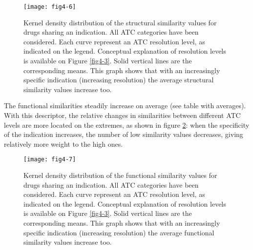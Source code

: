 \begin{figure}[H]
    \centering
    \texttt{[image: fig4-6]}
    \caption{Kernel density distribution of the structural similarity values for drugs sharing an indication. All ATC categories have been considered. Each curve represent an ATC resolution level, as indicated on the legend. Conceptual explanation of resolution levels is available on Figure \ref{fig4-3}. Solid vertical lines are the corresponding means. This graph shows that with an increasingly specific indication (increasing resolution) the average structural similarity values increase too.}
    \label{fig4-6}
\end{figure}

The functional similarities steadily increase on average (see table with averages). With this descriptor, the relative changes in similarities between different ATC levels are more located on the extremes, as shown in figure \ref{fig4-7}: when the specificity of the indication increases, the number of low similarity values decreases, giving relatively more weight to the high ones.

\begin{figure}[H]
    \centering
    \texttt{[image: fig4-7]}
    \caption{Kernel density distribution of the functional similarity values for drugs sharing an indication. All ATC categories have been considered. Each curve represent an ATC resolution level, as indicated on the legend. Conceptual explanation of resolution levels is available on Figure \ref{fig4-3}. Solid vertical lines are the corresponding means. This graph shows that with an increasingly specific indication (increasing resolution) the average functional similarity values increase too.}
    \label{fig4-7}
\end{figure}

